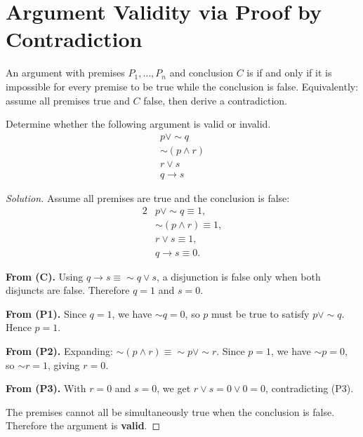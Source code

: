 \section{Argument Validity via Proof by Contradiction}

An argument with premises $P_1, \ldots, P_n$ and conclusion $C$ is
 if and only if it is impossible for every premise to be true
while the conclusion is false. Equivalently: assume all premises true and
$C$ false, then derive a contradiction.

\begin{example}
Determine whether the following argument is valid or invalid.
\[
\begin{array}{l}
    p \lor {\sim}q \\
    {\sim}(p \land r) \\
    r \lor s \\
    \hline
    q \to s
\end{array}
\]
\end{example}

\begin{proof}[Solution]
Assume all premises are true and the conclusion is false:
\begin{alignat}{2}
    &p \lor {\sim}q \equiv 1, \tag{P1}\\
    &{\sim}(p \land r) \equiv 1, \tag{P2}\\
    &r \lor s \equiv 1, \tag{P3}\\
    &q \to s \equiv 0. \tag{C}
\end{alignat}

\noindent\textbf{From (C).}
Using $q \to s \equiv {\sim}q \lor s$, a disjunction is false only when both
disjuncts are false. Therefore $q = 1$ and $s = 0$.

\noindent\textbf{From (P1).}
Since $q = 1$, we have ${\sim}q = 0$, so $p$ must be true to satisfy
$p \lor {\sim}q$. Hence $p = 1$.

\noindent\textbf{From (P2).}
Expanding: ${\sim}(p \land r) \equiv {\sim}p \lor {\sim}r$. Since $p = 1$,
we have ${\sim}p = 0$, so ${\sim}r = 1$, giving $r = 0$.

\noindent\textbf{From (P3).}
With $r = 0$ and $s = 0$, we get $r \lor s = 0 \lor 0 = 0$, contradicting (P3).

The premises cannot all be simultaneously true when the conclusion is false.
Therefore the argument is \textbf{valid}.
\end{proof}

